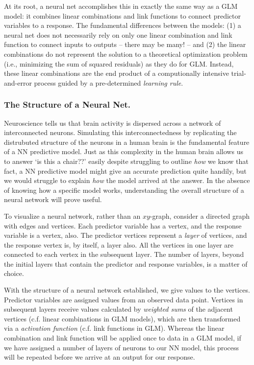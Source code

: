 \documentclass[12pt]{article}\usepackage[]{graphicx}\usepackage[]{color}
\begin{document}
At its root, a neural net accomplishes this in exactly the same way as a GLM model: it combines linear combinations and link functions to connect predictor 
variables to a response.  The fundamental differences between the models: (1) a neural net does not necessarily rely on only one linear combination 
and link function to connect inputs to outputs -- there may be many! -- and (2) the linear combinations do not represent the solution to a 
theoretical optimization problem (i.e., minimizing the sum of squared residuals) as they do for GLM.  Instead, these linear combinations are the end product of a 
computionally intensive trial-and-error process guided by a pre-determined \textit{learning rule}.

\subsubsection{The Structure of a Neural Net.}
Neuroscience tells us that brain activity is dispersed across a network of interconnected neurons.  Simulating this interconnectedness by replicating
the distrubuted structure of the neurons in a human brain is the fundamental feature of a NN predictive model.  Just as this complexity in the
human brain allows us to answer `is this a chair??' easily despite struggling to outline \textit{how} we know that fact, a NN predictive model might
give an accurate prediction quite handily, but we would struggle to explain \textit{how} the model arrived at the answer.  In the absence of 
knowing how a specific model works, understanding the overall structure of a neural network will prove useful.

To visualize a neural network, rather than an $xy$-graph, consider a directed graph with edges and vertices.  Each predictor variable has a vertex,
and the response variable is a vertex, also.  The predictor vertices represent a \textit{layer} of vertices, and the response vertex is, by itself,
a layer also.  All the vertices in one layer are connected to each vertex in the subsequent layer.  The number of layers, beyond the initial layers that contain the predictor and response variables, is a matter of choice.


With the structure of a neural network established, we give values to the vertices.  Predictor variables are assigned values from an observed data
point.  Vertices in subsequent layers receive values calculated by \textit{weighted sums} of the adjacent vertices (c.f. linear combinations in GLM
models), which are then transformed via a \textit{activation function} (c.f. link functions in GLM).  Whereas the linear combination and link
function will be applied once to data in a GLM model, if we have assigned a number of layers of neurons to our NN model, this process will be
repeated before we arrive at an output for our response.  
\end{document}

